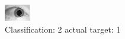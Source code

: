 \begin{figure}[h!]
\begin{center}
\includegraphics[width=0.60\columnwidth]{figures/ID1513_class_2_target_1.png}
\end{center}
\caption{ Classification: 2 actual target: 1}
\label{fig:ID1513_class_2_target_1}
\end{figure}
